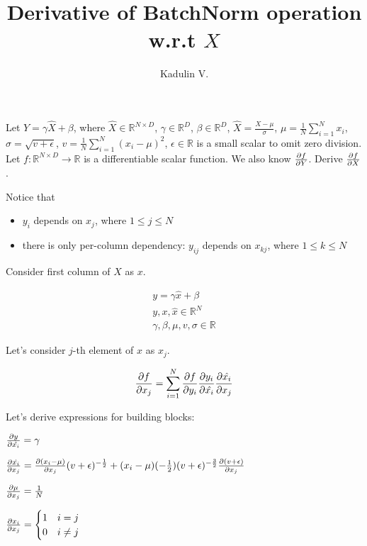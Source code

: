\documentclass[12pt]{article}
\begin{document}
\title{Derivative of BatchNorm operation w.r.t $X$}
\author{Kadulin V.}
\maketitle

Let $Y = \gamma \hat{X} + \beta$, where 
$\hat{X} \in \mathbb{R}^{N \times D}$, 
$\gamma \in \mathbb{R}^D$, 
$\beta \in \mathbb{R}^D$, 
$\hat{X} = \frac{X - \mu}{\sigma}$, 
$\mu = \frac{1}{N} \sum_{i=1}^{N} x_{i}$,
$\sigma = \sqrt{v + \epsilon}$,
$v = \frac{1}{N} \sum_{i=1}^{N} (x_i - \mu)^2$,
$\epsilon \in \mathbb{R}$ is a small scalar to omit zero division. 
Let $f: \mathbb{R}^{N \times D} \rightarrow \mathbb{R}$ is a differentiable scalar function. We also know $\pdv{f}{Y}$.
Derive $\pdv{f}{X}$.

Notice that
\begin{itemize}
\item $y_i$ depends on $x_j$, where $1 \le j \le N$
\item there is only per-column dependency: $y_{ij}$ depends on $x_{kj}$, where $1 \le k \le N$
\end{itemize}

Consider first column of $X$ as $x$.

\begin{equation*}
\begin{split}
y = \gamma \hat{x} + \beta \\
y, x, \hat{x} \in \mathbb{R}^N \\
\gamma, \beta, \mu, v, \sigma \in \mathbb{R}
\end{split}
\end{equation*}

Let's consider $j$-th element of $x$ as $x_j$.

\[
	\pdv{f}{x_j} = 
	\sum_{i=1}^{N} \pdv{f}{y_i} \pdv{y_i}{\hat{x_i}} \pdv{\hat{x_i}}{x_j}
\]

Let's derive expressions for building blocks:

$\pdv{y}{\hat{x_i}} = \gamma$ 

$\pdv{\hat{x_i}}{x_j} = 
\pdv{(x_i - \mu)}{x_j} (v + \epsilon)^{-\frac{1}{2}} + (x_i - \mu) (-\frac{1}{2}) (v + \epsilon)^{-\frac{3}{2}} \pdv{(v + \epsilon)}{x_j}$

$\pdv{\mu}{x_j} = \frac{1}{N}$

$
\pdv{x_i}{x_j} = 
\begin{cases}
1 &\text{$i = j$}\\
0 &\text{$i \ne j$}
\end{cases}
$
\end{document}
